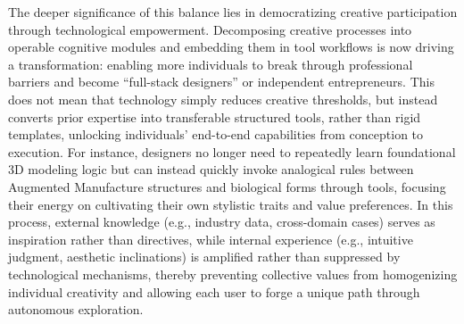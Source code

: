 The deeper significance of this balance lies in democratizing creative participation through technological empowerment. Decomposing creative processes into operable cognitive modules and embedding them in tool workflows is now driving a transformation: enabling more individuals to break through professional barriers and become ``full-stack designers'' or independent entrepreneurs\cite{bogenhold2014entrepreneurship}. This does not mean that technology simply reduces creative thresholds, but instead converts prior expertise into transferable structured tools, rather than rigid templates, unlocking individuals' end-to-end capabilities from conception to execution. For instance, designers no longer need to repeatedly learn foundational 3D modeling logic but can instead quickly invoke analogical rules between Augmented Manufacture structures and biological forms through tools\cite{yang2018recent}, focusing their energy on cultivating their own stylistic traits and value preferences\cite{schecter2025role}. In this process, external knowledge (e.g., industry data, cross-domain cases) serves as inspiration rather than directives, while internal experience (e.g., intuitive judgment, aesthetic inclinations) is amplified rather than suppressed by technological mechanisms, thereby preventing collective values\cite{schecter2025role} from homogenizing individual creativity\cite{anderson2024homogenization} and allowing each user to forge a unique path through autonomous exploration.  

